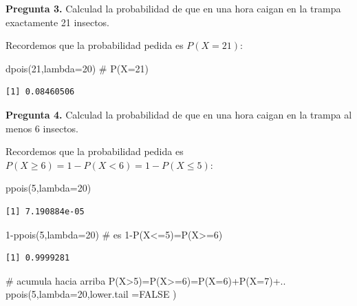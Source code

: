 \documentclass[
  letterpaper,
  DIV=11,
  numbers=noendperiod]{scrreprt}
\newenvironment{Shaded}{\begin{snugshade}}{\end{snugshade}}
\newcommand{\AttributeTok}[1]{\textcolor[rgb]{0.40,0.45,0.13}{#1}}
\newcommand{\CommentTok}[1]{\textcolor[rgb]{0.37,0.37,0.37}{#1}}
\newcommand{\ConstantTok}[1]{\textcolor[rgb]{0.56,0.35,0.01}{#1}}
\newcommand{\DecValTok}[1]{\textcolor[rgb]{0.68,0.00,0.00}{#1}}
\newcommand{\FunctionTok}[1]{\textcolor[rgb]{0.28,0.35,0.67}{#1}}
\newcommand{\NormalTok}[1]{\textcolor[rgb]{0.00,0.23,0.31}{#1}}
\newcommand{\SpecialCharTok}[1]{\textcolor[rgb]{0.37,0.37,0.37}{#1}}
\begin{document}
\textbf{Pregunta 3.} Calculad la probabilidad de que en una hora caigan
en la trampa exactamente 21 insectos.

Recordemos que la probabilidad pedida es \(P(X=21)\):

\begin{Shaded}
\begin{Highlighting}[]
\FunctionTok{dpois}\NormalTok{(}\DecValTok{21}\NormalTok{,}\AttributeTok{lambda=}\DecValTok{20}\NormalTok{) }\CommentTok{\# P(X=21)}
\end{Highlighting}
\end{Shaded}

\begin{verbatim}
[1] 0.08460506
\end{verbatim}

\textbf{Pregunta 4.} Calculad la probabilidad de que en una hora caigan
en la trampa al menos 6 insectos.

Recordemos que la probabilidad pedida es
\(P(X\geq 6)=1-P(X<6)=1-P(X\leq 5)\):

\begin{Shaded}
\begin{Highlighting}[]
\FunctionTok{ppois}\NormalTok{(}\DecValTok{5}\NormalTok{,}\AttributeTok{lambda=}\DecValTok{20}\NormalTok{)}
\end{Highlighting}
\end{Shaded}

\begin{verbatim}
[1] 7.190884e-05
\end{verbatim}

\begin{Shaded}
\begin{Highlighting}[]
\DecValTok{1}\SpecialCharTok{{-}}\FunctionTok{ppois}\NormalTok{(}\DecValTok{5}\NormalTok{,}\AttributeTok{lambda=}\DecValTok{20}\NormalTok{) }\CommentTok{\# es 1{-}P(X\textless{}=5)=P(X\textgreater{}=6)}
\end{Highlighting}
\end{Shaded}

\begin{verbatim}
[1] 0.9999281
\end{verbatim}

\begin{Shaded}
\begin{Highlighting}[]
\CommentTok{\# acumula hacia arriba P(X\textgreater{}5)=P(X\textgreater{}=6)=P(X=6)+P(X=7)+..}
\FunctionTok{ppois}\NormalTok{(}\DecValTok{5}\NormalTok{,}\AttributeTok{lambda=}\DecValTok{20}\NormalTok{,}\AttributeTok{lower.tail =}\ConstantTok{FALSE}\NormalTok{ ) }
\end{Highlighting}
\end{Shaded}
\end{document}

